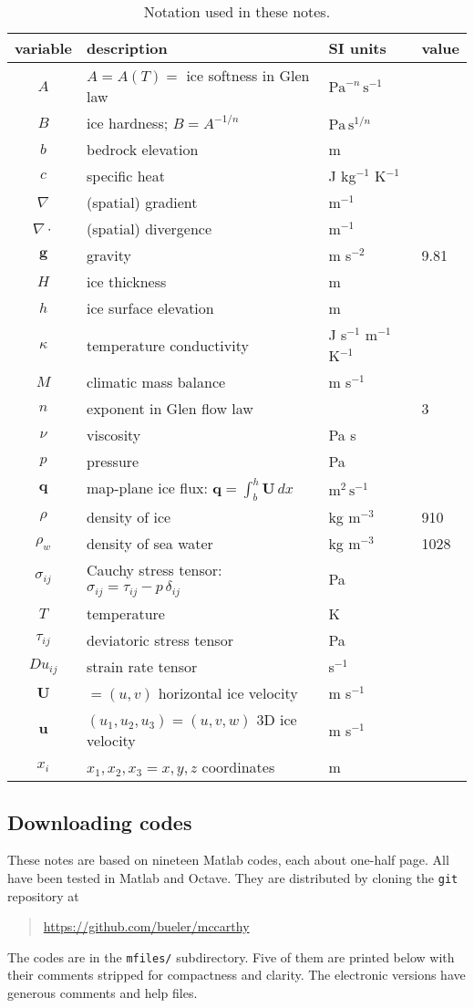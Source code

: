 \documentclass[letterpaper,final,12pt,reqno]{amsart}
\newcommand{\bq}{\mathbf{q}}
\newcommand{\bU}{\mathbf{U}}
\begin{document}
\begin{table}[ht]
\caption{Notation used in these notes.}
\begin{tabular}{clll}
variable  & description & SI units & value \\
\hline
$A$ & $A=A(T)=$ ice softness in Glen law & $\text{Pa}^{-n}\,\text{s}^{-1}$ \\
$B$ & ice hardness; $B=A^{-1/n}$ & $\text{Pa}\,\text{s}^{1/n}$ \\
$b$ & bedrock elevation & m \\
$c$ & specific heat & J kg$^{-1}$ K$^{-1}$ \\
$\nabla$ & (spatial) gradient & m$^{-1}$ \\
$\nabla\cdot$ & (spatial) divergence & m$^{-1}$ \\
$\mathbf{g}$ & gravity & m s$^{-2}$\phantom{foobar} & 9.81 \\
$H$ & ice thickness & m \\
$h$ & ice surface elevation & m \\
$\kappa$ & temperature conductivity & J s$^{-1}$ m$^{-1}$ K$^{-1}$ \\
$M$ & climatic mass balance & m s$^{-1}$ \\
$n$ & exponent in Glen flow law & & 3 \\
$\nu$ & viscosity & Pa s \\
$p$ & pressure & Pa \\
$\bq$ & map-plane ice flux: $\bq = \int_{b}^{h} \bU\,dx$ & $\text{m}^2\,\text{s}^{-1}$ \\
$\rho$ & density of ice & kg m$^{-3}$ & 910 \\
$\rho_w$ & density of sea water & kg m$^{-3}$ & 1028 \\
$\sigma_{ij}$ & Cauchy stress tensor: $\sigma_{ij} = \tau_{ij} - p\, \delta_{ij}$ & Pa \\
$T$ & temperature & K \\
$\tau_{ij}$ & deviatoric stress tensor & Pa \\
$Du_{ij}$ & strain rate tensor & s$^{-1}$ \\
$\mathbf{U}$ & $=(u,v)$ horizontal ice velocity & m s$^{-1}$ \\
$\mathbf{u}$ & $(u_1,u_2,u_3)=(u,v,w)$ 3D ice velocity & m s$^{-1}$ \\
$x_i$ & $x_1,x_2,x_3=x,y,z$ coordinates & m
\end{tabular}
\label{tab:notation}
\end{table}

\subsection*{Downloading codes}  These notes are based on nineteen Matlab codes, each about one-half page.  All have been tested in Matlab and Octave.  They are distributed by cloning the \texttt{git} repository at
\begin{quote}
\url{https://github.com/bueler/mccarthy}
\end{quote}
\noindent The codes are in the \texttt{mfiles/} subdirectory.  Five of them are printed below with their comments stripped for compactness and clarity.  The electronic versions have generous comments and help files.
\end{document}
